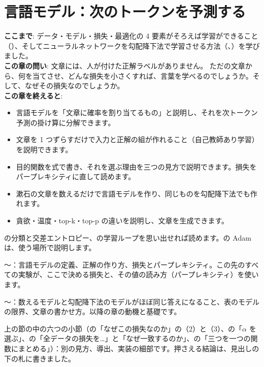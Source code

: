 \chapter{言語モデル：次のトークンを予測する}\label{ch:lm}

\begin{chapterlead}
\textbf{ここまで}: データ・モデル・損失・最適化の 4 要素がそろえば学習ができること（）、そしてニューラルネットワークを勾配降下法で学習させる方法（、）を学びました。\\[1mm]
\textbf{この章の問い}: 文章には、人が付けた正解ラベルがありません。
ただの文章から、何を当てさせ、どんな損失を小さくすれば、言葉を学べるのでしょうか。そして、なぜその損失なのでしょうか。\\[1mm]
\textbf{この章を終えると}:
\begin{itemize}
\item 言語モデルを「文章に確率を割り当てるもの」と説明し、それを次トークン予測の掛け算に分解できます。
\item 文章を 1 つずらすだけで入力と正解の組が作れること（自己教師あり学習）を説明できます。
\item 目的関数を式で書き、それを選ぶ理由を三つの見方で説明できます。損失をパープレキシティに直して読めます。
\item 漱石の文章を数えるだけで言語モデルを作り、同じものを勾配降下法でも作れます。
\item 貪欲・温度・top-k・top-p の違いを説明し、文章を生成できます。
\end{itemize}
\end{chapterlead}

\begin{readingguide}
\item[\rgpre] の分類と交差エントロピー、の学習ループを思い出せれば読めます。の Adam は、使う場所で説明します。
\item[\rgmust] 〜：言語モデルの定義、正解の作り方、損失とパープレキシティ。この先のすべての実験が、ここで決める損失と、その値の読み方（パープレキシティ）を使います。
\item[\rgmust] 〜：数えるモデルと勾配降下法のモデルがほぼ同じ答えになること、表のモデルの限界、文章の書かせ方。以降の章の動機と基礎です。
\item[\rgskim] 上の節の中の六つの小節（の「なぜこの損失なのか」の（2）と（3）、の「$\alpha$ を選ぶ」、の「全データの損失を…」と「なぜ一致するのか」、の「三つを一つの関数にまとめる」）：別の見方、導出、実装の細部です。押さえる結論は、見出しの下の札に書きました。
\end{readingguide}

